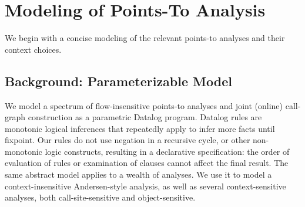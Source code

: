 



\section{Modeling of Points-To Analysis}
\label{sec:model}

We begin with a concise modeling of the relevant points-to analyses
and their context choices.

\subsection{Background: Parameterizable Model}

We model a spectrum of flow-insensitive points-to analyses and joint
(online) call-graph construction as a parametric Datalog program.
Datalog rules are monotonic logical inferences that repeatedly apply
to infer more facts until fixpoint. Our rules do not use negation in a
recursive cycle, or other non-monotonic logic constructs, resulting in
a declarative specification: the order of evaluation of rules or
examination of clauses cannot affect the final result. The same
abstract model applies to a wealth of analyses. We use it to model a
context-insensitive Andersen-style \cite{dvanhorn:andersen-phd94}
analysis, as well as several context-sensitive analyses, both
call-site-sensitive and object-sensitive.

